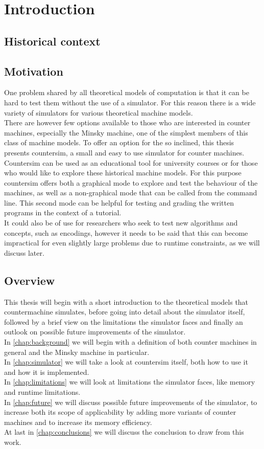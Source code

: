 \chapter{Introduction}
\section{Historical context}
\section{Motivation}
One problem shared by all theoretical models of computation is that it can be hard to test them without the use of a simulator.
For this reason there is a wide variety of simulators for various theoretical machine models\cite{Chakraborty:2011:FYA:2038876.2038893}.\\
There are however few options available to those who are interested in counter machines, especially the Minsky machine, one of the simplest members of this class of machine models. To offer an option for the so inclined, this thesis presents countersim, a small and easy to use simulator for counter machines.\\
Countersim can be used as an educational tool for university courses or for those who would like to explore these historical machine models. For this purpose countersim offers both a graphical mode to explore and test the behaviour of the machines, as well as a non-graphical mode that can be called from the command line. This second mode can be helpful for testing and grading the written programs in the context of a tutorial.\\
It could also be of use for researchers who seek to test new algorithms and concepts, such as encodings, however it needs to be said that this can become impractical for even slightly large problems due to runtime constraints, as we will discuss later.
\section{Overview}
This thesis will begin with a short introduction to the theoretical models that countermachine simulates, before going into detail about the simulator itself, followed by a brief view on the limitations the simulator faces and finally an outlook on possible future improvements of the simulator.\\
In \autoref{chap:background} we will begin with a definition of both counter machines in general and the Minsky machine in particular.\\
In \autoref{chap:simulator} we will take a look at countersim itself, both how to use it and how it is implemented.\\
In \autoref{chap:limitations} we will look at limitations the simulator faces, like memory and runtime limitations.\\
In \autoref{chap:future} we will discuss possible future improvements of the simulator, to increase both its scope of applicability by adding more variants of counter machines and to increase its memory efficiency.\\
At last in \autoref{chap:conclusions} we will discuss the conclusion to draw from this work.
